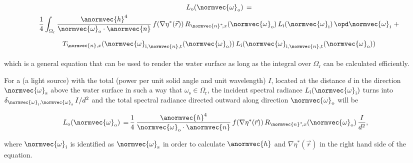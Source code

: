 \begin{equation} \label{eq:rendering_equation_simplified}
\renewcommand*{\arraystretch}{2}
\begin{array}{cl}
L_{\text{o}}(\normvec{\omega}_{\text{o}}) \,= \\
\displaystyle \frac{1}{4}\int_{\Omega_{\text{r}}} \frac{\anormvec{h}^4}{\normvec{\omega}_{\text{o}}\cdot\anormvec{n}}\,f(\nabla\eta^*(\vec{r}))\,R_{\normvec{n}^*\!,x}(\normvec{\omega}_{\text{o}})\, L_{\text{i}}(\normvec{\omega}_{\text{i}})\,\opd \normvec{\omega}_{\text{i}} \ + \\[1ex]
\displaystyle T_{\normvec{n},x}(\normvec{\omega}_{\text{i},\normvec{n},\text{t}}(\normvec{\omega}_{\text{o}}))\, L_{\text{i}}(\normvec{\omega}_{\text{i},\normvec{n},\text{t}}(\normvec{\omega}_{\text{o}}))
\end{array}
\end{equation}

which is a general equation that can be used to render the water surface as long as the integral over $\Omega_{\text{r}}$ can be calculated efficiently.

For a  (a light source) with the total  (power per unit solid angle and unit wavelength) $I$, located at the distance $d$ in the direction $\normvec{\omega}_{\text{s}}$ above the water surface in such a way that $\omega_{\text{s}} \in \Omega_{\text{r}}$, the incident spectral radiance $L_{\text{i}}(\normvec{\omega}_{\text{i}})$ turns into $\delta_{\normvec{\omega}_{\text{i}},\normvec{\omega}_{\text{s}}}\,I/d^2$ and the total spectral radiance directed outward along direction $\normvec{\omega}_{\text{o}}$ will be

\begin{equation} \label{eq:spectral_radience_reflected_point_light_source}
\renewcommand*{\arraystretch}{2}
\begin{aligned}
\displaystyle L_{\text{o}}(\normvec{\omega}_{\text{o}}) \,=\, & \frac{1}{4}\,\frac{\anormvec{h}^4}{\normvec{\omega}_{\text{o}}\cdot\anormvec{n}}\,f(\nabla\eta^*(\vec{r}))\,R_{\normvec{n}^*\!,x}(\normvec{\omega}_{\text{o}})\,\frac{I}{d^2},
\end{aligned}
\end{equation}

where $\normvec{\omega}_{\text{i}}$ is identified as $\normvec{\omega}_{\text{s}}$ in order to calculate $\anormvec{h}$ and $\nabla\eta^*(\vec{r})$ in the right hand side of the equation.

